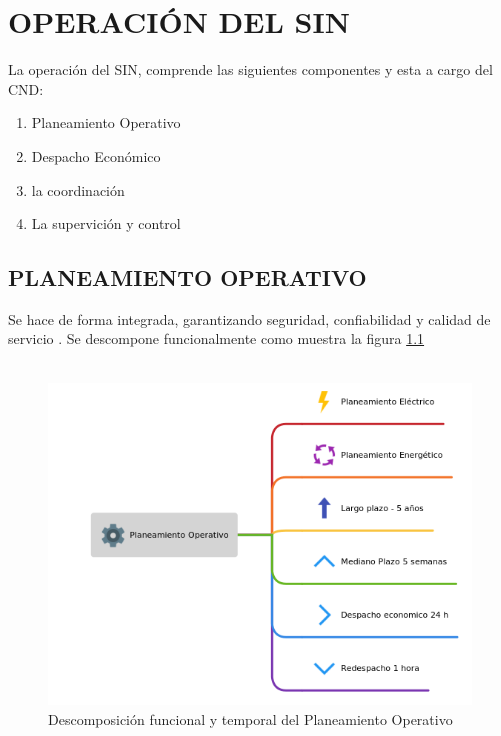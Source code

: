 \documentclass[a5paper]{book}%
\begin{document}
\chapter{OPERACIÓN DEL SIN}

La operación del \ac{SIN}, comprende las siguientes componentes y esta a cargo del \ac{CND}:

\begin{enumerate}
\item Planeamiento Operativo
\item Despacho Económico
\item la coordinación
\item La supervición y control
\end{enumerate}

\section{PLANEAMIENTO OPERATIVO}

Se hace de forma integrada, garantizando seguridad, confiabilidad y
calidad de servicio \cite{CREG0251995}. Se descompone funcionalmente
como muestra la figura \ref{fig:planeamineto-operativo}\\\\

\begin{figure}[H]
  \centering
  \caption{Descomposición funcional y temporal del Planeamiento
    Operativo}
  \label{fig:planeamineto-operativo}
  \includegraphics[width=1\linewidth]{planeamineto-operativo}
\end{figure}
\end{document}
